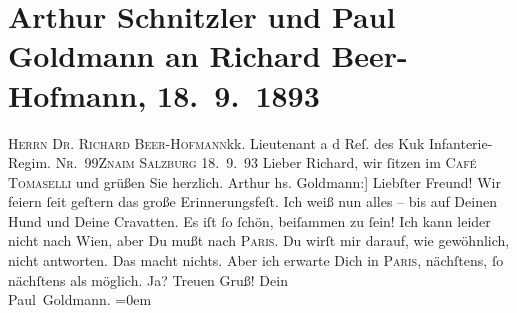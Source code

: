 

         
         \renewcommand{\erwaehntePersonen}{Personen: Richard Beer-Hofmann, Paul Goldmann}
         \renewcommand{\erwaehnteOrte}{Orte: Café Tomaselli, I., Innere Stadt, Paris, Salzburg, Wien, Wollzeile, Znaim}
         \renewcommand{\erwaehnteWerke}{}
               \section[Arthur Schnitzler und Paul Goldmann an Richard Beer-Hofmann, 18. 9. 1893]{ Arthur Schnitzler und Paul Goldmann an Richard Beer-Hofmann,
               18. 9. 1893}\nopagebreak{}\rehead{ }\begin{ledgroupsized}[t]{13cm}\normalsize\beginnumbering \toendnotes[C]{\smallbreak\pagebreak[2]} 
\pstart{}{\pb}\textsc{Herrn Dr. Richard Beer-Hofmann}\pend{}\pstart{}kk. Lieutenant a d Reſ. des Kuk Infanterie-Regim. \textsc{Nr. 99}\pend{}\pstart{}\textsc{Znaim}\pend{}{\bigskip}\pstart
           \raggedleft{}{\pb}\textsc{Salzburg} 18. 9. 93\pend
           \pstart{}Lieber Richard,\pend\pstart
           wir ſitzen im \textsc{Café Tomaselli} und grüßen Sie herzlich.\pend
           \pstart \spacefill\mbox{Arthur}\pend{}\pstart
           \noindent{}{[}hs. Goldmann:{]} Liebſter Freund!\pend
           \pstart
           Wir feiern ſeit geſtern das große Erinnerungsfeſt. Ich weiß nun alles – bis auf
               Deinen Hund und Deine Cravatten. Es iſt ſo ſchön, beiſammen zu ſein!\pend
           \pstart
           Ich kann leider nicht nach Wien, aber Du mußt nach
                  \textsc{Paris}. Du wirſt mir darauf, wie gewöhnlich, nicht antworten. Das macht nichts. Aber
               ich  erwarte Dich in \textsc{Paris}, nächſtens, ſo nächſtens als möglich. Ja? Treuen Gruß!\pend
           \pstart
           Dein{\\[\baselineskip]}\spacefill\mbox{Paul Goldmann.}\pend
           \leftskip=0em{}
         

\end{ledgroupsized}
